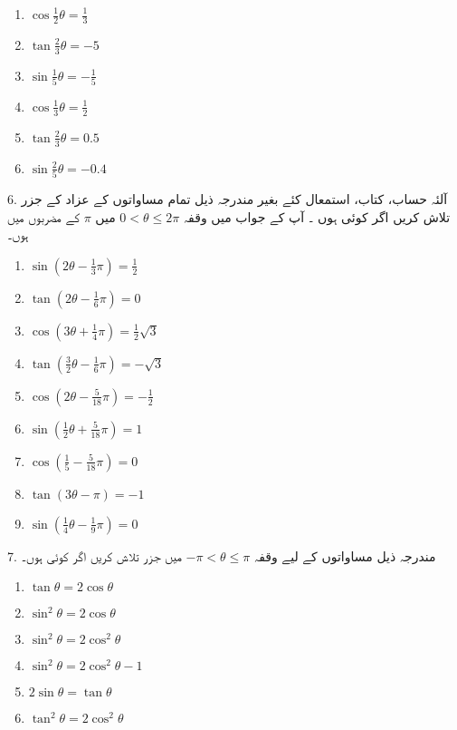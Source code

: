 \begin{multicols}{3}
\begin{enumerate}[a]
\item \(\cos \frac{1}{2}\theta =\frac{1}{3}\)
\item \(\tan\frac{2}{3}\theta=-5\)
\item \(\sin \frac{1}{5}\theta=-\frac{1}{5}\)
\item \(\cos \frac{1}{3}\theta=\frac{1}{2}\)
\item \(\tan\frac{2}{3}\theta=0.5\)
\item \(\sin \frac{2}{5}\theta = -0.4\)
\end{enumerate}
\end{multicols}
6. آلئہ حساب، کتاب، استمعال کئے بغیر مندرجہ ذیل تمام مساواتوں کے عزاد کے جزر تلاش کریں اگر کوئی ہوں ۔ آپ کے جواب میں وقفہ 
\(0<\theta\le 2\pi\)
میں
\(\pi\)
کے مضربوں میں ہوں۔\\
\begin{multicols}{3}
\begin{enumerate}[a]
\item \(\sin(2\theta - \frac{1}{3}\pi)=\frac{1}{2}\)
\item \(\tan(2\theta - \frac{1}{6}\pi)=0\)
\item \(\cos(3\theta+\frac{1}{4}\pi) =\frac{1}{2}\sqrt{3}\)
\item \(\tan(\frac{3}{2}\theta-\frac{1}{6}\pi)=-\sqrt3\)
\item \(\cos(2\theta-\frac{5}{18}\pi)=-\frac{1}{2}\)
\item \(\sin (\frac{1}{2}\theta+\frac{5}{18}\pi)=1\)
\item \(\cos(\frac{1}{5}-\frac{5}{18}\pi)=0\)
\item \(\tan(3\theta-\pi)=-1\)
\item \(\sin (\frac{1}{4}\theta -\frac{1}{9}\pi)=0\) 
\end{enumerate}
\end{multicols}
7. مندرجہ ذیل مساواتوں کے لیے وقفہ 
\(-\pi<\theta\le\pi\)
میں جزر تلاش کریں اگر کوئی ہوں۔\\
\begin{multicols}{3}
\begin{enumerate}[a]
\item \(\tan\theta = 2\cos\theta\)
\item \(\sin^2\theta=2\cos\theta\)
\item \(\sin^2\theta=2\cos^2\theta\)
\item \(\sin^2\theta = 2\cos^2\theta -1\)
\item \(2\sin\theta =\tan\theta\)
\item \(\tan^2\theta=2\cos^2\theta\)
\end{enumerate}
\end{multicols}
